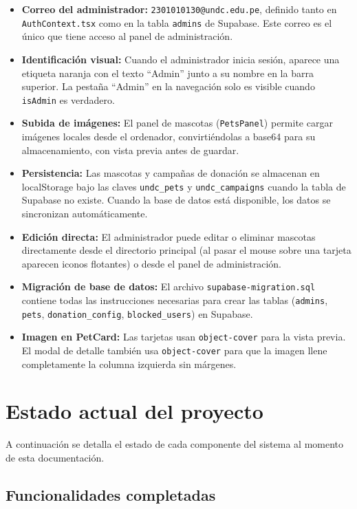 \documentclass[12pt,a4paper]{article}
\begin{document}
\begin{itemize}
    \item \textbf{Correo del administrador:} \texttt{2301010130@undc.edu.pe}, definido tanto en \texttt{AuthContext.tsx} como en la tabla \texttt{admins} de Supabase. Este correo es el único que tiene acceso al panel de administración.
    \item \textbf{Identificación visual:} Cuando el administrador inicia sesión, aparece una etiqueta naranja con el texto ``Admin'' junto a su nombre en la barra superior. La pestaña ``Admin'' en la navegación solo es visible cuando \texttt{isAdmin} es verdadero.
    \item \textbf{Subida de imágenes:} El panel de mascotas (\texttt{PetsPanel}) permite cargar imágenes locales desde el ordenador, convirtiéndolas a base64 para su almacenamiento, con vista previa antes de guardar.
    \item \textbf{Persistencia:} Las mascotas y campañas de donación se almacenan en localStorage bajo las claves \texttt{undc\_pets} y \texttt{undc\_campaigns} cuando la tabla de Supabase no existe. Cuando la base de datos está disponible, los datos se sincronizan automáticamente.
    \item \textbf{Edición directa:} El administrador puede editar o eliminar mascotas directamente desde el directorio principal (al pasar el mouse sobre una tarjeta aparecen iconos flotantes) o desde el panel de administración.
    \item \textbf{Migración de base de datos:} El archivo \texttt{supabase-migration.sql} contiene todas las instrucciones necesarias para crear las tablas (\texttt{admins}, \texttt{pets}, \texttt{donation\_config}, \texttt{blocked\_users}) en Supabase.
    \item \textbf{Imagen en PetCard:} Las tarjetas usan \texttt{object-cover} para la vista previa. El modal de detalle también usa \texttt{object-cover} para que la imagen llene completamente la columna izquierda sin márgenes.
\end{itemize}

\section{Estado actual del proyecto}

A continuación se detalla el estado de cada componente del sistema al momento de esta documentación.

\subsection{Funcionalidades completadas}
\end{document}
